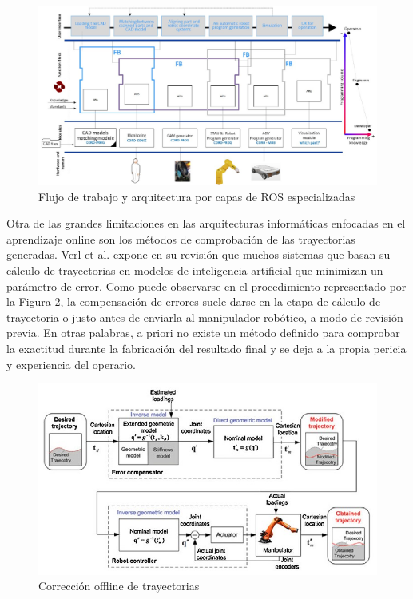 \begin{figure}[h!]
    \centering
    \includegraphics[scale=0.35]{figuras/arquitectura_Wei_2018.jpg}
    \caption{Flujo de trabajo y arquitectura por capas de \acrshort{ROS} especializadas \cite{Wei_2018}}
    \label{fig:arquitectura_Wei_2018}
\end{figure}

Otra de las grandes limitaciones en las arquitecturas informáticas enfocadas en el aprendizaje online son los métodos de comprobación de las trayectorias generadas. Verl et al. \cite{Verl_2019} expone en su revisión que muchos sistemas que basan su cálculo de trayectorias en modelos de inteligencia artificial que minimizan un parámetro de error. Como puede observarse en el procedimiento representado por la Figura \ref{fig:correccion_trayectorias_offline}, la compensación de errores suele darse en la etapa de cálculo de trayectoria o justo antes de enviarla al manipulador robótico, a modo de revisión previa. En otras palabras, a priori no existe un método definido para comprobar la exactitud durante la fabricación del resultado final y se deja a la propia pericia y experiencia del operario.

\begin{figure}[h!]
    \centering
    \includegraphics[scale=0.5]{figuras/correccion_trayectorias_offline.jpg}
    \caption{Corrección offline de trayectorias \cite{Klimchik2014}}
    \label{fig:correccion_trayectorias_offline}
\end{figure}

